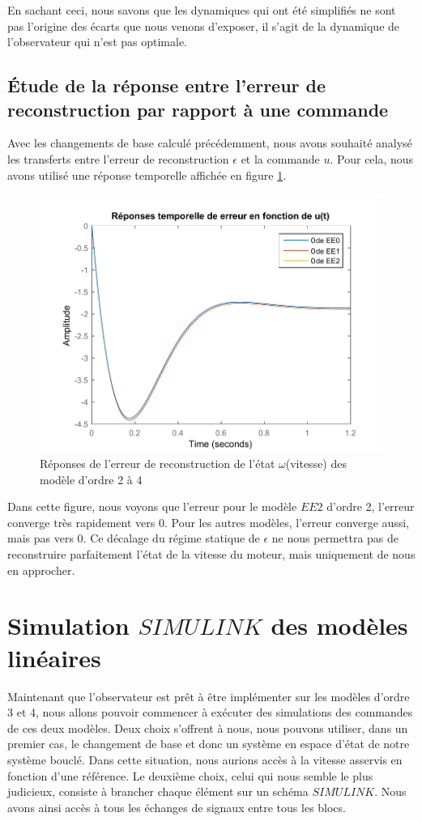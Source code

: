 En sachant ceci, nous savons que les dynamiques qui ont été simplifiés ne sont pas l'origine des écarts que nous venons d'exposer, il s'agit de la dynamique de l'observateur qui n'est pas optimale. 

\subsection{Étude de la réponse entre l'erreur de reconstruction par rapport à une commande}\label{sub:etudeTransfertErreurCommande}
Avec les changements de base calculé précédemment, nous avons souhaité analysé les transferts entre l'erreur de reconstruction $\epsilon$ et la commande $u$. Pour cela, nous avons utilisé une réponse temporelle affichée en figure \ref{fig:repTemporelle_erreurReconstruction}.  
\begin{figure}[!ht]
\centering
\includegraphics[width= .9\textwidth]{./III/figure/reponses_temp-erreurDeReconstruction.pdf}
\caption{\label{fig:repTemporelle_erreurReconstruction}Réponses de l'erreur de reconstruction de l'état $\omega$(vitesse) des modèle d'ordre 2 à 4}
\end{figure}Dans cette figure, nous voyons que l'erreur pour le modèle $EE2$ d'ordre 2, l'erreur converge très rapidement vers 0. Pour les autres modèles, l'erreur converge aussi, mais pas vers 0. Ce décalage du régime statique de $\epsilon$ ne nous permettra pas de reconstruire parfaitement l'état de la vitesse du moteur, mais uniquement de nous en approcher. 


\section{Simulation $SIMULINK$ des modèles linéaires}
Maintenant que l'observateur est prêt à être implémenter sur les modèles d'ordre 3 et 4, nous allons pouvoir commencer à exécuter des simulations des commandes de ces deux modèles. Deux choix s'offrent à nous, nous pouvons utiliser, dans un premier cas, le changement de base et donc un système en espace d'état de notre système bouclé. Dans cette situation, nous aurions accès à la vitesse asservis en fonction d'une référence. Le deuxième choix, celui qui nous semble le plus judicieux, consiste à brancher chaque élément sur un schéma $SIMULINK$. Nous avons ainsi accès à tous les échanges de signaux entre tous les blocs. 


